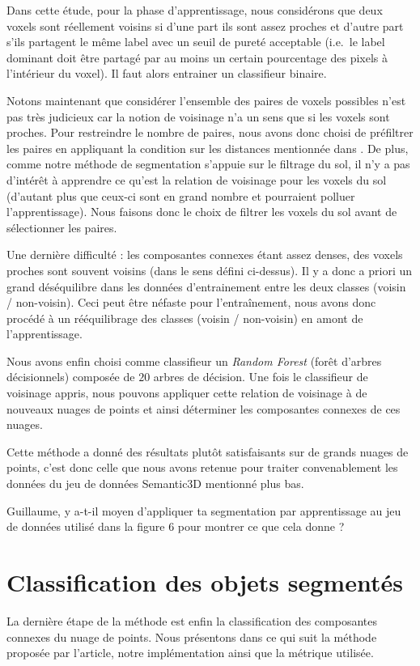 \documentclass[a4paper, onecolumn, 11pt]{article}
\newcommand{\TODO}{\fbox{\textcolor{red}{TODO}}}
\begin{document}
Dans cette étude, pour la phase d'apprentissage, nous considérons que deux voxels sont réellement voisins si d'une part ils sont assez proches et d'autre part s'ils partagent le même label avec un seuil de pureté acceptable (i.e.\ le label dominant doit être partagé par au moins un certain pourcentage des pixels à l'intérieur du voxel). Il faut alors entrainer un classifieur binaire. 

Notons maintenant que considérer l'ensemble des paires de voxels possibles n'est pas très judicieux car la notion de voisinage n'a un sens que si les voxels sont proches. Pour restreindre le nombre de paires, nous avons donc choisi de préfiltrer les paires en appliquant la condition sur les distances mentionnée dans  \cite{aka_article}. De plus, comme notre méthode de segmentation s'appuie sur le filtrage du sol, il n'y a pas d'intérêt à apprendre ce qu'est la relation de voisinage pour les voxels du sol (d'autant plus que ceux-ci sont en grand nombre et pourraient polluer l'apprentissage). Nous faisons donc le choix de filtrer les voxels du sol avant de sélectionner les paires. 

Une dernière difficulté : les composantes connexes étant assez denses, des voxels proches sont souvent voisins (dans le sens défini ci-dessus).  Il y a donc a priori un grand déséquilibre dans les données d'entrainement entre les deux classes (voisin / non-voisin). Ceci peut être néfaste pour l'entraînement, nous avons donc procédé à un rééquilibrage des classes (voisin / non-voisin) en amont de l'apprentissage. 

Nous avons enfin choisi comme classifieur un \emph{Random Forest} (forêt d'arbres décisionnels) composée de $20$ arbres de décision. Une fois le classifieur de voisinage appris, nous pouvons appliquer cette relation de voisinage à de nouveaux nuages de points et ainsi déterminer les composantes connexes de ces nuages.

Cette méthode a donné des résultats plutôt satisfaisants sur de grands nuages de points, c'est donc celle que nous avons retenue pour traiter convenablement les données du jeu de données Semantic3D mentionné plus bas.

\TODO Guillaume, y a-t-il moyen d'appliquer ta segmentation par apprentissage au jeu de données utilisé dans la figure 6 pour montrer ce que cela donne ?

\section{Classification des objets segmentés}
La dernière étape de la méthode est enfin la classification des composantes connexes du nuage de points. Nous présentons dans ce qui suit la méthode proposée par l'article, notre implémentation ainsi que la métrique utilisée.
\end{document}
